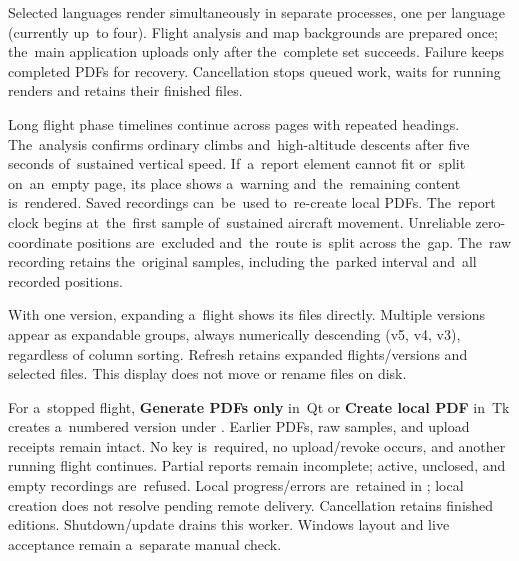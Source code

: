 \documentclass[11pt,a4paper]{article}
\newcommand{\filepath}[1]{\path{#1}}
\newcommand{\ui}[1]{\textbf{#1}}
\begin{document}
Selected languages render simultaneously in separate processes, one per
language (currently up~to four). Flight analysis and map backgrounds are
prepared
once; the~main application uploads only after the~complete set succeeds.
Failure keeps completed PDFs for recovery. Cancellation stops queued work,
waits for running renders and retains their finished files.

Long flight phase timelines continue across pages with repeated headings.
The~analysis confirms ordinary climbs and~high-altitude descents
after five seconds of~sustained vertical speed. If~a~report element cannot fit
or~split on~an~empty page, its place shows a~warning and~the~remaining content
is~rendered. Saved recordings can~be~used to~re-create local PDFs.
The~report clock begins at~the~first sample of~sustained aircraft movement.
Unreliable zero-coordinate positions are~excluded and~the~route is~split
across the~gap. The~raw recording retains the~original samples, including
the~parked interval and~all recorded positions.

With one version, expanding a~flight shows its files directly. Multiple versions
appear as expandable groups, always numerically descending (v5, v4, v3),
regardless of column sorting. Refresh retains expanded flights/versions and
selected files. This display does not move or rename files on disk.

For a~stopped flight, \ui{Generate PDFs only} in~Qt or
\ui{Create local PDF} in~Tk creates
a~numbered version under \filepath{reports/}. Earlier PDFs, raw samples,
and upload receipts remain intact. No key is~required, no upload/revoke occurs,
and another running flight continues. Partial reports remain incomplete; active,
unclosed, and empty recordings are~refused. Local progress/errors are~retained
in \filepath{manual-report.json}; local creation does not resolve pending
remote delivery. Cancellation retains finished editions. Shutdown/update drains
this worker. Windows layout and live acceptance remain a~separate manual check.
\end{document}
